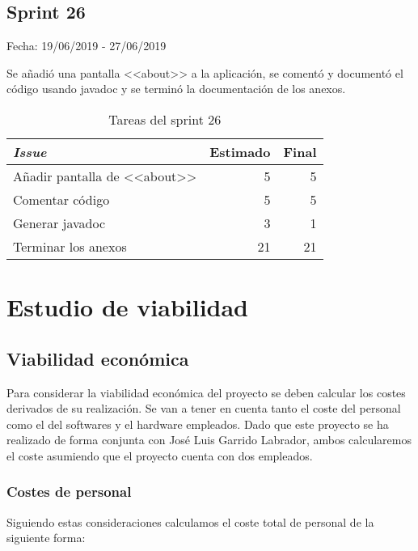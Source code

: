 \subsection{Sprint 26}

Fecha: 19/06/2019 - 27/06/2019

Se añadió una pantalla <<about>> a la aplicación, se comentó y documentó el código usando javadoc y se terminó la documentación de los anexos. 

\begin{table}[H]
	\begin{tabularx}{\textwidth}{Xrr}
		\toprule \textbf{\textit{Issue}} & \textbf{Estimado} & \textbf{Final}\\
		\toprule
		Añadir pantalla de <<about>> & 5 & 5 \\
		Comentar código & 5 & 5 \\
		Generar javadoc & 3 & 1 \\
		Terminar los anexos & 21 & 21 \\
		\bottomrule
	\end{tabularx}
	\caption{Tareas del sprint 26}
\end{table}

\section{Estudio de viabilidad}

\subsection{Viabilidad económica}

Para considerar la viabilidad económica del proyecto se deben calcular los costes derivados de su realización. Se van a tener en cuenta tanto el coste del personal como el del softwares y el hardware empleados. Dado que este proyecto se ha realizado de forma conjunta con José Luis Garrido Labrador, ambos calcularemos el coste asumiendo que el proyecto cuenta con dos empleados.

\subsubsection{Costes de personal} 

Siguiendo estas consideraciones calculamos el coste total de personal de la siguiente forma: 

